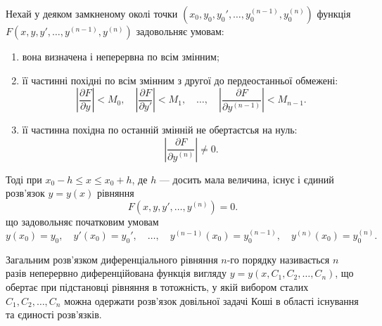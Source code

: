 \begin{theorem}
	Нехай у деяком замкненому околі точки $\left(x_0, y_0, y_0', \ldots, y_0^{(n-1)}, y_0^{(n)}\right)$ функція $F\left(x,y,y',\ldots,y^{(n-1)},y^{(n)}\right)$ задовольняє умовам:
	\begin{enumerate}
		\item вона визначена і неперервна по всім змінним;
		\item її частинні похідні по всім змінним з другої до пердеостанньої обмежені:
		\begin{equation*}
			\left|\frac{\partial F}{\partial y}\right| < M_0, \quad \left|\frac{\partial F}{\partial y'}\right| < M_1, \quad \ldots, \quad \left|\frac{\partial F}{\partial y^{(n-1)}}\right| < M_{n-1}.
		\end{equation*}
		\item її частинна похідна по останній змінній не обертаєтсья на нуль: \[\left|\frac{\partial F}{\partial y^{(n)}}\right|\ne0.\]
	\end{enumerate}
	
	Тоді при $x_0 - h \le x \le x_0 + h$, де $h$ --- досить мала величина, існує і єдиний розв'язок $y=y(x)$ рівняння
	\begin{equation*}
		F \left( x, y, y', \ldots, y^{(n)} \right) = 0.
	\end{equation*}
	що задовольняє початковим умовам
	\begin{equation*}
		y(x_0) = y_0, \quad y'(x_0) = y_0', \quad \ldots, \quad y^{(n - 1)} (x_0) = y_0^{(n-1)}, \quad y^{(n)} (x_0) = y_0^{(n)}.
	\end{equation*}
\end{theorem}

\begin{definition}
	Загальним розв'язком диференціального рівняння $n$-го порядку називається $n$ разів неперервно диференційована функція вигляду $y = y(x,C_1, C_2, \ldots, C_n)$, що обертає при підстановці рівняння в тотожність, у якій вибором сталих $C_1, C_2, \ldots, C_n$ можна одержати роз\-в'я\-зок довільної задачі Коші в області існування та єдиності розв'язків.
\end{definition}

